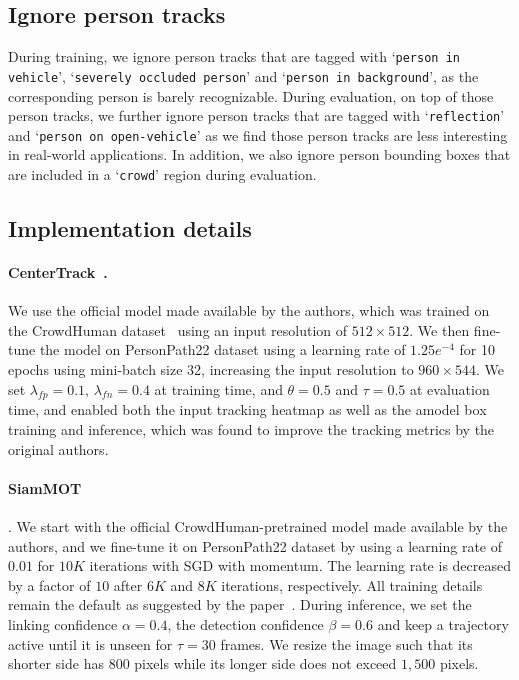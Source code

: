 \documentclass[runningheads]{llncs}
\begin{document}
\subsection{Ignore person tracks}
During training, we ignore person tracks that are tagged with `\texttt{person in vehicle}', `\texttt{severely occluded person}' and `\texttt{person in background}', as the corresponding person is barely recognizable. During evaluation, on top of those person tracks, we further ignore person tracks that are tagged with `\texttt{reflection}' and `\texttt{person on open-vehicle}' as we find those person tracks are less interesting in real-world applications. In addition, we also ignore person bounding boxes that are included in a `\texttt{crowd}' region during evaluation.   

\subsection{Implementation details}

\paragraph{CenterTrack~\cite{centertrack}.} We use the official model made available by the authors, which was trained on the CrowdHuman dataset~\cite{shao2018crowdhuman} using an input resolution of $512 \times 512$. We then fine-tune the model on PersonPath22 dataset using a learning rate of $1.25e^{-4}$ for 10 epochs using mini-batch size 32, increasing the input resolution to $960 \times 544$. We set $\lambda_{fp}=0.1$, $\lambda_{fn}=0.4$ at training time, and $\theta = 0.5$ and $\tau = 0.5$ at evaluation time, and enabled both the input tracking heatmap as well as the amodel box training and inference, which was found to improve the tracking metrics by the original authors.

\paragraph{SiamMOT~\cite{siammot}}. We start with the official CrowdHuman-pretrained model made available by the authors, and we fine-tune it on PersonPath22 dataset by using a learning rate of $0.01$ for $10K$ iterations with SGD with momentum. The learning rate is decreased by a factor of $10$ after $6K$ and $8K$ iterations, respectively. All training details remain the default as suggested by the paper~\cite{siammot}. During inference, we set the linking confidence $\alpha = 0.4$, the detection confidence $\beta = 0.6$ and keep a trajectory active until it is unseen for $\tau = 30$ frames. We resize the image such that its shorter side has $800$ pixels while its longer side does not exceed $1,500$ pixels.
\end{document}
